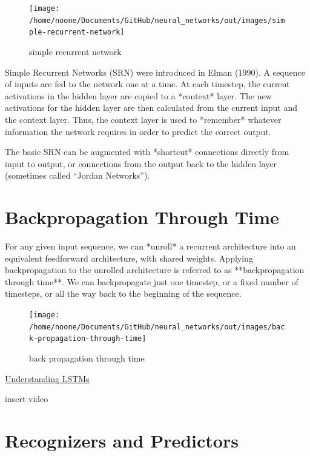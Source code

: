 \documentclass[11pt]{article}
\begin{document}
\begin{figure}[h]
    \centering
    \texttt{[image: /home/noone/Documents/GitHub/neural\_networks/out/images/simple-recurrent-network]}
    \caption[simple recurrent network]{simple recurrent network}
    \label{fig: simple recurrent network}
\end{figure}

Simple Recurrent Networks (SRN) were introduced in Elman (1990).
A sequence of inputs are fed to the network one at a time.
At each timestep, the current activations in the hidden layer are copied to a *context* layer.
The new activations for the hidden layer are then calculated from the current input and the context layer.
Thus, the context layer is used to *remember* whatever information the network requires in order to predict the correct output.

The basic SRN can be augmented with *shortcut* connections directly from input to output, or connections from the output back to the hidden layer (sometimes called “Jordan Networks”).

\section{Backpropagation Through Time}\label{sec:backpropagation-through-time}

For any given input sequence, we can *unroll* a recurrent architecture into an equivalent feedforward architecture, with shared weights.
Applying backpropagation to the unrolled architecture is referred to as **backpropagation through time**.
We can backpropagate just one timestep, or a fixed number of timesteps, or all the way back to the beginning of the sequence.

\begin{figure}[h]
    \centering
    \texttt{[image: /home/noone/Documents/GitHub/neural\_networks/out/images/back-propagation-through-time]}
    \caption[back propagation through time]{back propagation through time}
    \label{fig: back propagation through time}
\end{figure}

\href{http://colah.github.io/posts/2015-08-Understanding-LSTMs/}{Understanding LSTMs}

insert video

\section{Recognizers and Predictors}\label{sec:recognizers-and-predictors}
\end{document}
